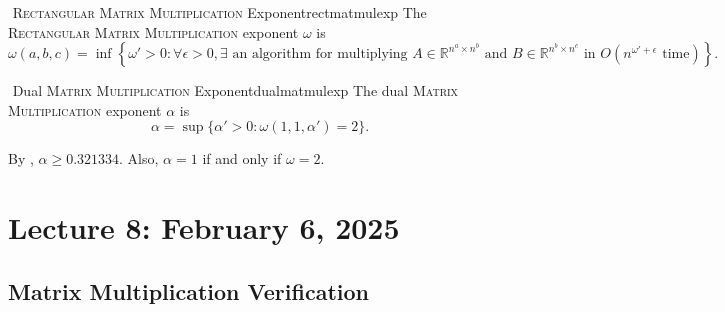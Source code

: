         \begin{definition}{\Stop\,\,\textsc{Rectangular Matrix Multiplication} Exponent}{rectmatmulexp}
            The \textsc{Rectangular Matrix Multiplication} exponent \(\omega\) is
            \footnotesize\begin{equation*}
                \omega(a,b,c)=\inf\left\{\omega'>0:\forall\epsilon>0,\exists\text{ an algorithm for multiplying }A\in\mathbb{R}^{n^a\times n^b}\text{ and }B\in\mathbb{R}^{n^b\times n^c}\text{ in }O\left(n^{\omega'+\epsilon}\text{ time}\right)\right\}.
            \end{equation*}
        \end{definition}
        \begin{definition}{\Stop\,\,Dual \textsc{Matrix Multiplication} Exponent}{dualmatmulexp}
            The dual \textsc{Matrix Multiplication} exponent \(\alpha\) is
            \begin{equation*}
                \alpha=\sup\{\alpha'>0:\omega(1,1,\alpha')=2\}.
            \end{equation*}
        \end{definition}
        \begin{remark*}
            By \cite{williams2023new}, \(\alpha\geq0.321334\). Also, \(\alpha=1\) if and only if \(\omega=2\).
        \end{remark*}

\pagebreak

\section{Lecture 8: February 6, 2025}

    \subsection{Matrix Multiplication Verification}

